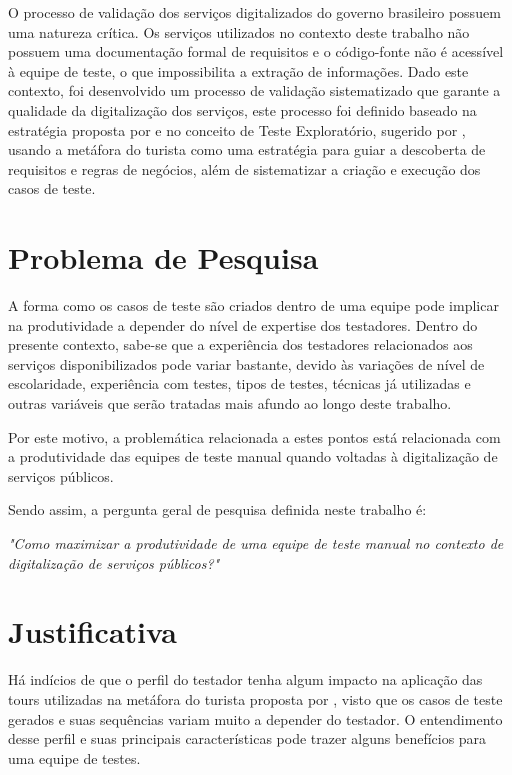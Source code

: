 O processo de validação dos serviços digitalizados do governo brasileiro possuem uma natureza crítica. Os serviços utilizados no
contexto deste trabalho não possuem uma documentação formal de requisitos e o código-fonte não é acessível à equipe de teste, o que
impossibilita a extração de informações. Dado este contexto, foi desenvolvido um processo de validação sistematizado que garante
a qualidade da digitalização dos serviços, este processo foi definido baseado na estratégia proposta por \cite{elcock2006testing} e
no conceito de Teste Exploratório, sugerido por \cite{whittaker2009exploratory}, usando a metáfora do turista como uma estratégia
para guiar a descoberta de requisitos e regras de negócios, além de sistematizar a criação e execução dos casos de teste.

\section{Problema de Pesquisa}

A forma como os casos de teste são criados dentro de uma equipe pode implicar na produtividade a depender do nível de expertise dos
testadores. Dentro do presente contexto, sabe-se que a experiência dos testadores relacionados aos serviços disponibilizados
pode variar bastante, devido às variações de nível de escolaridade, experiência com testes, tipos de testes, técnicas já utilizadas
e outras variáveis que serão tratadas mais afundo ao longo deste trabalho.

Por este motivo, a problemática relacionada a estes pontos está relacionada com a produtividade das equipes de teste manual quando
voltadas à digitalização de serviços públicos. 


Sendo assim, a pergunta geral de pesquisa definida neste trabalho é:

\textit{"Como maximizar a produtividade de uma equipe de teste manual no contexto de digitalização de serviços públicos?"}

\section{Justificativa}

Há indícios de que o perfil do testador tenha algum impacto na aplicação das tours utilizadas na metáfora do turista proposta por
\cite{whittaker2009exploratory}, visto que os casos de teste gerados e suas sequências variam muito a depender do testador.
O entendimento desse perfil e suas principais características pode trazer alguns benefícios para uma equipe de testes.

